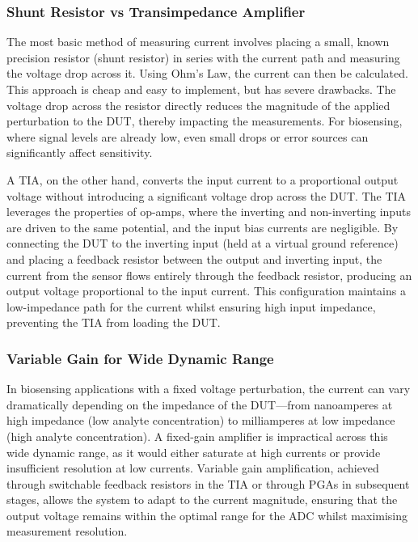 \subsubsection{Shunt Resistor vs Transimpedance Amplifier}
The most basic method of measuring current involves placing a small, known precision resistor (shunt resistor) in series with the current path and measuring the voltage drop across it. Using Ohm's Law, the current can then be calculated. This approach is cheap and easy to implement, but has severe drawbacks. The voltage drop across the resistor directly reduces the magnitude of the applied perturbation to the \ac{DUT}, thereby impacting the measurements. For biosensing, where signal levels are already low, even small drops or error sources can significantly affect sensitivity.

A \ac{TIA}, on the other hand, converts the input current to a proportional output voltage without introducing a significant voltage drop across the \ac{DUT}. The TIA leverages the properties of op-amps, where the inverting and non-inverting inputs are driven to the same potential, and the input bias currents are negligible. By connecting the \ac{DUT} to the inverting input (held at a virtual ground reference) and placing a feedback resistor between the output and inverting input, the current from the sensor flows entirely through the feedback resistor, producing an output voltage proportional to the input current. This configuration maintains a low-impedance path for the current whilst ensuring high input impedance, preventing the TIA from loading the \ac{DUT}.

\subsubsection{Variable Gain for Wide Dynamic Range}
In biosensing applications with a fixed voltage perturbation, the current can vary dramatically depending on the impedance of the \ac{DUT}—from nanoamperes at high impedance (low analyte concentration) to milliamperes at low impedance (high analyte concentration). A fixed-gain amplifier is impractical across this wide dynamic range, as it would either saturate at high currents or provide insufficient resolution at low currents. Variable gain amplification, achieved through switchable feedback resistors in the TIA or through \acp{PGA} in subsequent stages, allows the system to adapt to the current magnitude, ensuring that the output voltage remains within the optimal range for the \ac{ADC} whilst maximising measurement resolution.

